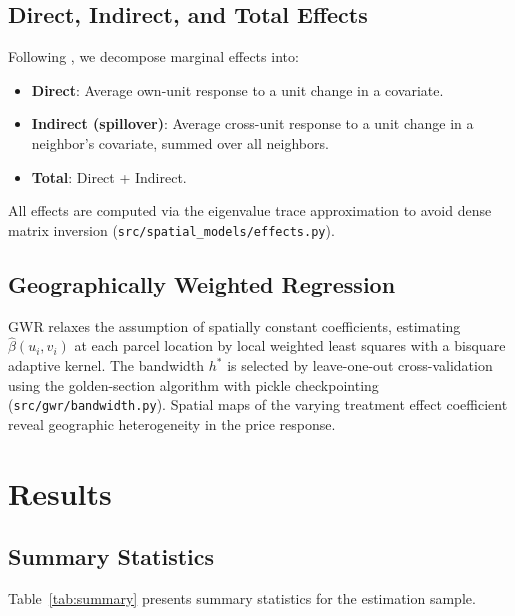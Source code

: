 \documentclass[12pt]{article}
\begin{document}
\subsection{Direct, Indirect, and Total Effects}

Following \citet{LeSage2009}, we decompose marginal effects into:
\begin{itemize}[noitemsep]
  \item \textbf{Direct}: Average own-unit response to a unit change in a covariate.
  \item \textbf{Indirect (spillover)}: Average cross-unit response to a unit change
    in a neighbor's covariate, summed over all neighbors.
  \item \textbf{Total}: Direct + Indirect.
\end{itemize}
All effects are computed via the eigenvalue trace approximation to avoid dense
matrix inversion (\texttt{src/spatial\_models/effects.py}).

\subsection{Geographically Weighted Regression}

GWR \citep{Fotheringham2002} relaxes the assumption of spatially constant
coefficients, estimating $\hat\beta(u_i,v_i)$ at each parcel location by
local weighted least squares with a bisquare adaptive kernel. The bandwidth
$h^*$ is selected by leave-one-out cross-validation using the golden-section
algorithm with pickle checkpointing (\texttt{src/gwr/bandwidth.py}).
Spatial maps of the varying treatment effect coefficient reveal geographic
heterogeneity in the price response.

\section{Results}
\label{sec:results}

\subsection{Summary Statistics}

Table~\ref{tab:summary} presents summary statistics for the estimation sample.

\begin{table}[H]
\caption{Summary Statistics}
\label{tab:summary}
\centering

\end{table}
\end{document}
